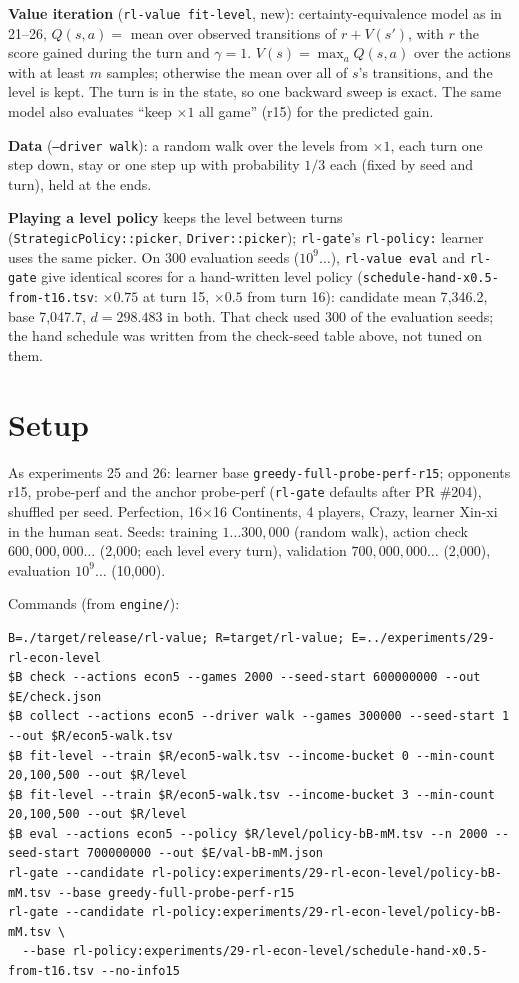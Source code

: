 \documentclass{../polyexp}
\begin{document}
\textbf{Value iteration} (\texttt{rl-value fit-level}, new): certainty-equivalence model as in 21--26, $Q(s,a) =$
mean over observed transitions of $r + V(s')$, with $r$ the score gained during the turn and $\gamma = 1$. $V(s) =
\max_a Q(s,a)$ over the actions with at least $m$ samples; otherwise the mean over all of $s$'s transitions, and
the level is kept. The turn is in the state, so one backward sweep is exact. The same model also evaluates ``keep
$\times1$ all game'' (r15) for the predicted gain.

\textbf{Data} (\texttt{--driver walk}): a random walk over the levels from $\times1$, each turn one step down, stay
or one step up with probability $1/3$ each (fixed by seed and turn), held at the ends.

\textbf{Playing a level policy} keeps the level between turns (\texttt{StrategicPolicy::picker},
\texttt{Driver::picker}); \texttt{rl-gate}'s \texttt{rl-policy:} learner uses the same picker. On 300 evaluation seeds
($10^9\dots$), \texttt{rl-value eval} and \texttt{rl-gate} give identical scores for a hand-written level policy
(\texttt{schedule-hand-x0.5-from-t16.tsv}: $\times0.75$ at turn 15, $\times0.5$ from turn 16): candidate mean
7{,}346.2, base 7{,}047.7, $d = 298.483$ in both. That check used 300 of the evaluation seeds; the hand schedule was
written from the check-seed table above, not tuned on them.

\section{Setup}
As experiments 25 and 26: learner base \texttt{greedy-full-probe-perf-r15}; opponents r15, probe-perf and the anchor
probe-perf (\texttt{rl-gate} defaults after PR \#204), shuffled per seed. Perfection, 16$\times$16 Continents,
4 players, Crazy, learner Xin-xi in the human seat. Seeds: training $1\dots300{,}000$ (random walk), action check
$600{,}000{,}000\dots$ (2{,}000; each level every turn), validation $700{,}000{,}000\dots$ (2{,}000), evaluation
$10^9\dots$ (10{,}000).

Commands (from \texttt{engine/}):
\begin{verbatim}
B=./target/release/rl-value; R=target/rl-value; E=../experiments/29-rl-econ-level
$B check --actions econ5 --games 2000 --seed-start 600000000 --out $E/check.json
$B collect --actions econ5 --driver walk --games 300000 --seed-start 1 --out $R/econ5-walk.tsv
$B fit-level --train $R/econ5-walk.tsv --income-bucket 0 --min-count 20,100,500 --out $R/level
$B fit-level --train $R/econ5-walk.tsv --income-bucket 3 --min-count 20,100,500 --out $R/level
$B eval --actions econ5 --policy $R/level/policy-bB-mM.tsv --n 2000 --seed-start 700000000 --out $E/val-bB-mM.json
rl-gate --candidate rl-policy:experiments/29-rl-econ-level/policy-bB-mM.tsv --base greedy-full-probe-perf-r15
rl-gate --candidate rl-policy:experiments/29-rl-econ-level/policy-bB-mM.tsv \
  --base rl-policy:experiments/29-rl-econ-level/schedule-hand-x0.5-from-t16.tsv --no-info15
\end{verbatim}
\end{document}
